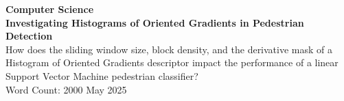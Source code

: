 \documentclass[a4paper, 12pt]{article}
\begin{document}

\begin{titlepage}
    \begin{center}
        \vspace*{1cm}
        \large{\textbf{Computer Science}}\\
        \vspace{3cm}
        \Large{\textbf{Investigating Histograms of Oriented Gradients in Pedestrian Detection}}\\
        \vspace{1.5cm}
        \large{How does the sliding window size, block density, and the derivative mask of a Histogram of Oriented Gradients descriptor impact the performance of a linear Support Vector Machine pedestrian classifier?}\\
        \vspace{3cm}
        \large{Word Count: 2000}
        \vfill
        \large{May 2025}
    \end{center}
\end{titlepage}




\begin{center}
\tableofcontents
\vspace{1in}
\end{center}
\newpage
{}



\newpage
\printbibliography[
heading=bibintoc,
]
\newpage

\end{document}
